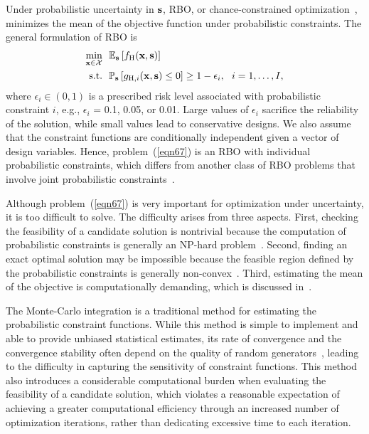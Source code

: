 \documentclass[iicol,sn-basic]{sn-jnl}%
\begin{document}
Under probabilistic uncertainty in ${\bf s}$, RBO, or chance-constrained optimization~\citep{Campi2011}, minimizes the mean of the objective function under probabilistic constraints.
The general formulation of RBO is
\begin{equation}\label{eqn67}
	\begin{aligned}
		\underset{{\bf x} \in \mathcal{X}}{\min} \ \ & \mathbb{E}_{\bf s}\left[f_\text{H}({\bf x},{\bf s})\right]\\
		\textrm{s.t.} \ \ 
		& \mathbb{P}_{\bf s}\left[g_{\text{H},i}({\bf x},{\bf s}) \leq 0\right] \geq 1-\epsilon_i,\ \ i=1,\dots,I, 
	\end{aligned}
\end{equation}
where $\epsilon_i \in (0,1)$ is a prescribed risk level associated with probabilistic constraint $i$, e.g., $\epsilon_i$ = 0.1, 0.05, or 0.01.
Large values of $\epsilon_i$ sacrifice the reliability of the solution, while small values lead to conservative designs.
We also assume that the constraint functions are conditionally independent given a vector of design variables.
Hence, problem~(\ref{eqn67}) is an RBO with individual probabilistic constraints, which differs from another class of RBO problems that involve joint probabilistic constraints~\citep{Xie2018}.

Although problem~(\ref{eqn67}) is very important for optimization under uncertainty, it is too difficult to solve. 
The difficulty arises from three aspects.
First, checking the feasibility of a candidate solution is nontrivial because the computation of probabilistic constraints is generally an NP-hard problem~\citep{Geng2019}.
Second, finding an exact optimal solution may be impossible because the feasible region defined by the probabilistic constraints is generally non-convex~\citep{Nemirovski2012}.
Third, estimating the mean of the objective is computationally demanding, which is discussed in~\Cref{Sec631}.

The Monte-Carlo integration is a traditional method for estimating the probabilistic constraint functions.
While this method is simple to implement and able to provide unbiased statistical estimates, its rate of convergence and the convergence stability often depend on the quality of random generators~\citep{Melchers2018}, leading to the difficulty in capturing the sensitivity of constraint functions.
This method also introduces a considerable computational burden when evaluating the feasibility of a candidate solution, which violates a reasonable expectation of achieving a greater computational efficiency through an increased number of optimization iterations, rather than dedicating excessive time to each iteration.
\end{document}

